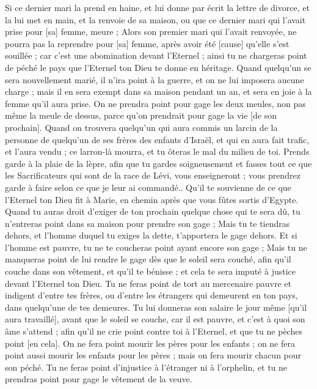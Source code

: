 \begin{multicols}{2}
Si ce dernier mari la prend en haine, et lui donne par écrit la lettre de divorce, et la lui met en main, et la renvoie de sa maison, ou que ce dernier mari qui l'avait prise pour [sa] femme, meure ;
Alors son premier mari qui l'avait renvoyée, ne pourra pas la reprendre pour [sa] femme, après avoir été [cause] qu'elle s'est souillée ; car c'est une abomination devant l'Eternel ; ainsi tu ne chargeras point de péché le pays que l'Eternel ton Dieu te donne en héritage.
Quand quelqu'un se sera nouvellement marié, il n'ira point à la guerre, et on ne lui imposera aucune charge ; mais il en sera exempt dans sa maison pendant un an, et sera en joie à la femme qu'il aura prise.
On ne prendra point pour gage les deux meules, non pas même la meule de dessus, parce qu'on prendrait pour gage la vie [de son prochain].
Quand on trouvera quelqu'un qui aura commis un larcin de la personne de quelqu'un de ses frères des enfants d'Israël, et qui en aura fait trafic, et l'aura vendu ; ce larron-là mourra, et tu ôteras le mal du milieu de toi.
Prends garde à la plaie de la lèpre, afin que tu gardes soigneusement et fasses tout ce que les Sacrificateurs qui sont de la race de Lévi, vous enseigneront ; vous prendrez garde à faire selon ce que je leur ai commandé..
Qu'il te souvienne de ce que l'Eternel ton Dieu fit à Marie, en chemin après que vous fûtes sortis d'Egypte.
Quand tu auras droit d'exiger de ton prochain quelque chose qui te sera dû, tu n'entreras point dans sa maison pour prendre son gage ;
Mais tu te tiendras dehors, et l'homme duquel tu exiges la dette, t'apportera le gage dehors.
Et si l'homme est pauvre, tu ne te coucheras point ayant encore son gage ;
Mais tu ne manqueras point de lui rendre le gage dès que le soleil sera couché, afin qu'il couche dans son vêtement, et qu'il te bénisse ; et cela te sera imputé à justice devant l'Eternel ton Dieu.
Tu ne feras point de tort au mercenaire pauvre et indigent d'entre tes frères, ou d'entre les étrangers qui demeurent en ton pays, dans quelqu'une de tes demeures.
Tu lui donneras son salaire le jour même [qu'il aura travaillé], avant que le soleil se couche, car il est pauvre, et c'est à quoi son âme s'attend ; afin qu'il ne crie point contre toi à l'Eternel, et que tu ne pèches point [en cela].
On ne fera point mourir les pères pour les enfants ; on ne fera point aussi mourir les enfants pour les pères ; mais on fera mourir chacun pour son péché.
Tu ne feras point d'injustice à l'étranger ni à l'orphelin, et tu ne prendras point pour gage le vêtement de la veuve.

\end{multicols}
